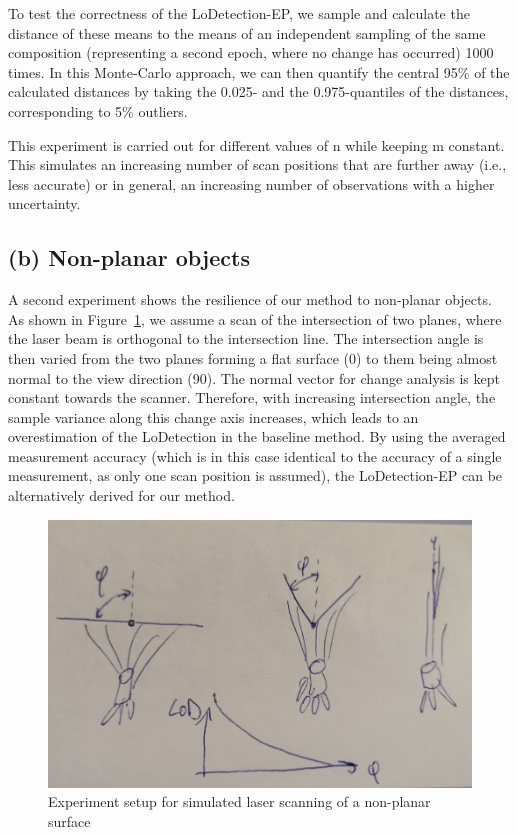 \documentclass[preprint,12pt,3p]{elsarticle}
\begin{document}
To test the correctness of the LoDetection-EP, we sample and calculate the distance of these means to the means of an independent sampling of the same composition (representing a second epoch, where no change has occurred) 1000 times. In this Monte-Carlo approach, we can then quantify the central 95\% of the calculated distances by taking the 0.025- and the 0.975-quantiles of the distances, corresponding to 5\% outliers.

This experiment is carried out for different values of n while keeping m constant. This simulates an increasing number of scan positions that are further away (i.e., less accurate) or in general, an increasing number of observations with a higher uncertainty.

\subsection{(b) Non-planar objects}
\label{sec:methods-b}
A second experiment shows the resilience of our method to non-planar objects. As shown in Figure~\ref{fig:setup_b}, we assume a scan of the intersection of two planes, where the laser beam is orthogonal to the intersection line. The intersection angle is then varied from the two planes forming a flat surface (0\degree) to them being almost normal to the view direction (90\degree). 
The normal vector for change analysis is kept constant towards the scanner. Therefore, with increasing intersection angle, the sample variance along this change axis increases, which leads to an overestimation of the LoDetection in the baseline method. By using the averaged measurement accuracy (which is in this case identical to the accuracy of a single measurement, as only one scan position is assumed), the LoDetection-EP can be alternatively derived for our method.

\begin{figure}
    \centering
    \includegraphics[width=0.9\linewidth]{figs/experiment2a.png}
    \caption{Experiment setup for simulated laser scanning of a non-planar surface}
    \label{fig:setup_b}
\end{figure}
\end{document}
